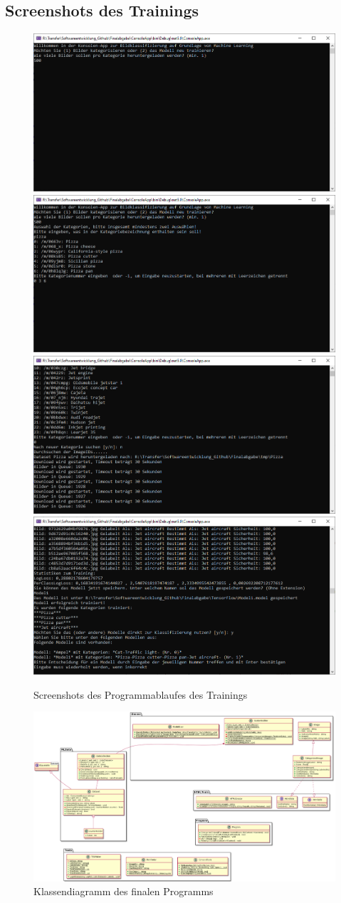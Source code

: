 \documentclass[doktyp=parbeit]{TUBAFarbeiten}
\begin{document}
\subsection*{Screenshots des Trainings}
\begin{figure}[H]
	\centering
	\includegraphics[width=0.6\linewidth]{Bilder/Programm02}
	\includegraphics[width=0.6\linewidth]{Bilder/Programm03}
	\includegraphics[width=0.6\linewidth]{Bilder/Programm05}
	\includegraphics[width=0.6\linewidth]{Bilder/Programm07}
	\caption{Screenshots des Programmablaufes des Trainings}
	\label{fig:programm01}
\end{figure}

\begin{landscape}
	\begin{figure}
		\centering
		\includegraphics[width=1\linewidth]{Bilder/Classdiagramm}
		\caption{Klassendiagramm des finalen Programms}
		\label{fig:classdiagramm}
	\end{figure}
	
\end{landscape}
\end{document}
